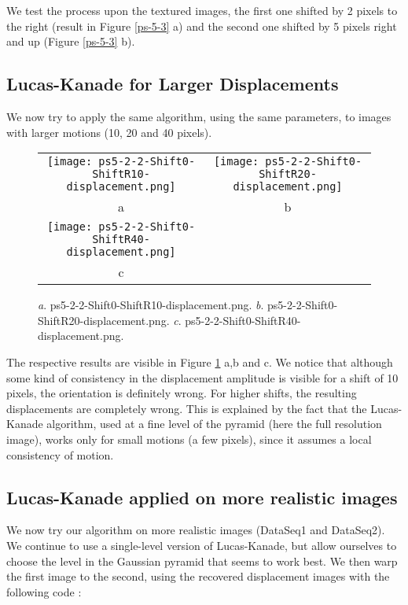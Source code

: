 \documentclass[a4paper,11pt]{article}
\begin{document}
We test the process upon the textured images, the first one shifted by 2 pixels to the right (result in Figure \ref{ps-5-3} a) and the second one shifted by 5 pixels right and up (Figure \ref{ps-5-3} b).

\subsection{Lucas-Kanade for Larger Displacements}

We now try to apply the same algorithm, using the same parameters, to images with larger motions (10, 20 and 40 pixels).

\begin{figure}[H]
\begin{center}
\begin{tabular}{cc}
	\texttt{[image: ps5-2-2-Shift0-ShiftR10-displacement.png]}&
	\texttt{[image: ps5-2-2-Shift0-ShiftR20-displacement.png]}\\
	a&b\\
	\texttt{[image: ps5-2-2-Shift0-ShiftR40-displacement.png]}\\
	c
\end{tabular}
\end{center}
\caption{ 
\textit{a}. ps5-2-2-Shift0-ShiftR10-displacement.png.  \textit{b}. ps5-2-2-Shift0-ShiftR20-displacement.png. \textit{c}. ps5-2-2-Shift0-ShiftR40-displacement.png.  }
\label{ps-5-4}
\end{figure}

The respective results are visible in Figure \ref{ps-5-4} a,b and c.
We notice that although some kind of consistency in the displacement amplitude is visible for a shift of 10 pixels, the orientation is definitely wrong. For higher shifts, the resulting displacements are completely wrong.
This is explained by the fact that the Lucas-Kanade algorithm, used at a fine level of the pyramid (here the full resolution image), works only for small motions (a few pixels), since it assumes a local consistency of motion.

\subsection{Lucas-Kanade applied on more realistic images}

We now try our algorithm on more realistic images (DataSeq1 and DataSeq2). 
We continue to use a single-level version of Lucas-Kanade, but allow ourselves to choose the level in the Gaussian pyramid that seems to work best.
We then warp the first image to the second, using the recovered displacement images with the following code : 
\lstset{style=mystyle}

\end{document}
